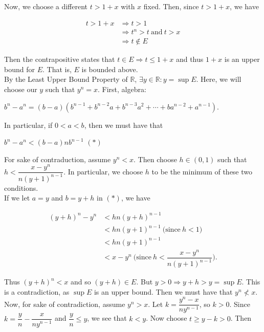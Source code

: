 \documentclass{article}
\begin{document}
Now, we choose a different $t > 1+x$ with $x$ fixed. Then, since $t> 1+x$, we have

\begin{align*}
    t > 1+x &\Longrightarrow t>1\\
    &\Longrightarrow t^n>t \ \text{and} \ t>x\\
    &\Longrightarrow t \notin E
\end{align*}

Then the contrapositive states that $t \in E \Longrightarrow t \leq 1+x$ and thus $1+x$ is an upper bound for $E$. That is, $E$ is bounded above.\\

By the Least Upper Bound Property of $\mathbb{R}$, $\exists y \in \mathbb{R}:y=\sup{E}$. Here, we will choose our $y$ such that $y^n=x$. First, algebra: 
\begin{center}
    $b^n-a^n=(b-a)(b^{n-1}+b^{n-2}a+b^{n-3}a^2+ \cdots + ba^{n-2}+a^{n-1})$.
\end{center}

In particular, if $0<a<b$, then we must have that 

\begin{center}
    $b^n-a^n<(b-a)nb^{n-1}$ $(*)$
\end{center}

For sake of contraduction, assume $y^n<x$. Then choose $h \in (0,1)$ such that $h < \dfrac{x-y^n}{n(y+1)^{n-1}}$. In particular, we choose $h$ to be the minimum of these two conditions.\\

If we let $a=y$ and $b=y+h$ in $(*)$, we have 

\begin{align*}
    (y+h)^n-y^n &< hn(y+h)^{n-1}\\
    &<hn(y+1)^{n-1} \ \text{(since} \ h<1)\\
    &< hn(y+1)^{n-1}\\
    &<x-y^n \ \biggl(\text{since} \ h < \dfrac{x-y^n}{n(y+1)^{n-1}}\biggr).
\end{align*}

Thus $(y+h)^n < x$ and so $(y+h) \in E$. But $y>0 \Longrightarrow y+h>y=\sup{E}$. This is a contradiction, as $\sup{E}$ is an upper bound. Then we must have that $y^n \not<x$. \\

Now, for sake of contradiction, assume $y^n>x$. Let $k=\dfrac{y^n-x}{ny^{n-1}}$, so $k>0$. Since $k=\dfrac{y}{n}-\dfrac{x}{ny^{n-1}}$ and $\dfrac{y}{n} \leq y$, we see that $k<y$. Now choose $t \geq y-k > 0$. Then 
\end{document}
